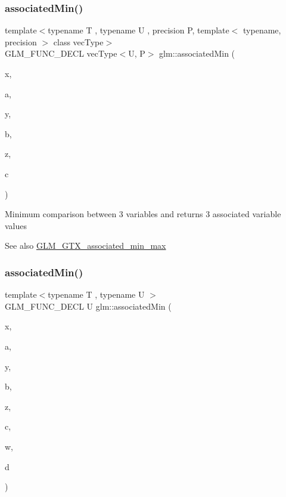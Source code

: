 \subsubsection{\texorpdfstring{associated\+Min()}{associatedMin()}\hspace{0.1cm}{\footnotesize\ttfamily [6/10]}}
{\footnotesize\ttfamily template$<$typename T , typename U , precision P, template$<$ typename, precision $>$ class vec\+Type$>$ \\
G\+L\+M\+\_\+\+F\+U\+N\+C\+\_\+\+D\+E\+CL vec\+Type$<$U, P$>$ glm\+::associated\+Min (\begin{DoxyParamCaption}\item[{vec\+Type$<$ T, P $>$ const \&}]{x,  }\item[{vec\+Type$<$ U, P $>$ const \&}]{a,  }\item[{vec\+Type$<$ T, P $>$ const \&}]{y,  }\item[{vec\+Type$<$ U, P $>$ const \&}]{b,  }\item[{vec\+Type$<$ T, P $>$ const \&}]{z,  }\item[{vec\+Type$<$ U, P $>$ const \&}]{c }\end{DoxyParamCaption})}

Minimum comparison between 3 variables and returns 3 associated variable values \begin{DoxySeeAlso}{See also}
\hyperlink{group__gtx__associated__min__max}{G\+L\+M\+\_\+\+G\+T\+X\+\_\+associated\+\_\+min\+\_\+max} 
\end{DoxySeeAlso}
\mbox{\label{group__gtx__associated__min__max_ga432224ebe2085eaa2b63a077ecbbbff6}} 
\subsubsection{\texorpdfstring{associated\+Min()}{associatedMin()}\hspace{0.1cm}{\footnotesize\ttfamily [7/10]}}
{\footnotesize\ttfamily template$<$typename T , typename U $>$ \\
G\+L\+M\+\_\+\+F\+U\+N\+C\+\_\+\+D\+E\+CL U glm\+::associated\+Min (\begin{DoxyParamCaption}\item[{T}]{x,  }\item[{U}]{a,  }\item[{T}]{y,  }\item[{U}]{b,  }\item[{T}]{z,  }\item[{U}]{c,  }\item[{T}]{w,  }\item[{U}]{d }\end{DoxyParamCaption})}

